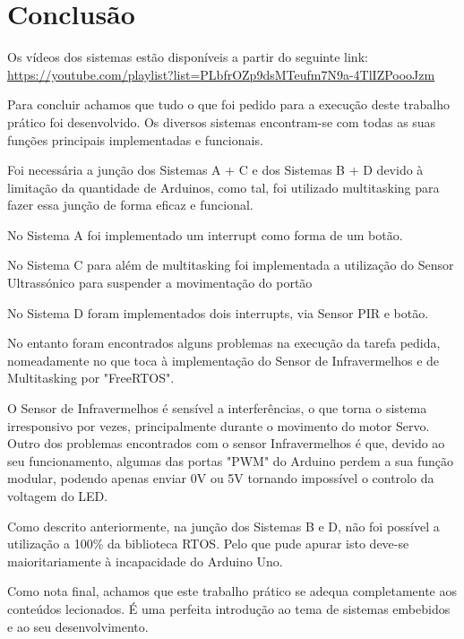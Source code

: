 \chapter*{Conclusão}

Os vídeos dos sistemas estão disponíveis a partir do seguinte link:\\
 \url{https://youtube.com/playlist?list=PLbfrOZp9dsMTeufm7N9a-4TlIZPoooJzm}

Para concluir achamos que tudo o que foi pedido para a execução deste trabalho prático foi desenvolvido. Os diversos sistemas encontram-se com todas as suas funções principais implementadas e funcionais.

Foi necessária a junção dos Sistemas A + C e dos Sistemas B + D devido à limitação da quantidade de Arduinos, como tal, foi utilizado multitasking para fazer essa junção de forma eficaz e funcional.

No Sistema A foi implementado um interrupt como forma de um botão.

No Sistema C para além de multitasking foi implementada a utilização do Sensor Ultrassónico para suspender a movimentação do portão

No Sistema D foram implementados dois interrupts, via Sensor PIR e botão.

No entanto foram encontrados alguns problemas na execução da tarefa pedida,  nomeadamente no que toca à implementação do Sensor de Infravermelhos e de Multitasking por "FreeRTOS". 

O Sensor de Infravermelhos é sensível a interferências, o que torna o sistema irresponsivo por vezes, principalmente durante o movimento do motor Servo. Outro dos problemas encontrados com o sensor Infravermelhos é que, devido ao seu funcionamento, algumas das portas "PWM" do Arduino perdem a sua função modular, podendo apenas enviar 0V ou 5V tornando impossível o controlo da voltagem do LED.

Como descrito anteriormente, na junção dos Sistemas B e D, não foi possível a utilização a 100\% da biblioteca RTOS. Pelo que pude apurar isto deve-se maioritariamente à incapacidade do Arduino Uno.

Como nota final, achamos que este trabalho prático se adequa completamente aos conteúdos lecionados. É uma perfeita introdução ao tema de sistemas embebidos e ao seu desenvolvimento.